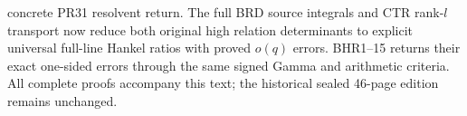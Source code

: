 concrete PR31 resolvent return. The full BRD source integrals
and CTR rank-$l$ transport now reduce both original high relation
determinants to explicit universal full-line Hankel ratios with
proved $o(q)$ errors. BHR1--15 returns their exact one-sided
errors through the same signed Gamma and arithmetic criteria.
All complete proofs accompany this text; the historical sealed
46-page edition remains unchanged.
